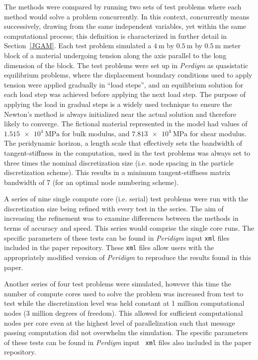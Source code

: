 \documentclass[preprint,12pt]{elsarticle}
\begin{document}
The methods were compared by running two sets of test problems where each
method would solve a problem concurrently. In this context, concurrently means
successively, drawing from the same independent variables, yet within the same
computational process; this definition is characterized in further detail in
Section~\ref{JGAM}. Each test problem simulated a $\SI{4}{\meter}$ by
$\SI{0.5}{\meter}$ by $\SI{0.5}{\meter}$ meter block of a material undergoing
tension along the axis parallel to the long dimension of the block. The test
problems were set up in \emph{Perdigm} as quasistatic equilibrium problems,
where the displacement boundary conditions used to apply tension were applied
gradually in ``load steps'', and an equilibrium solution for each load step was
achieved before applying the next load step. The purpose of applying the load
in gradual steps is a widely used technique to ensure the Newton's method is
always initialized near the actual solution and therefore likely to converge.
The fictional material represented in the model had values of
$\SI{1.515e4}{\mega\pascal}$ for bulk modulus, and $\SI{7.813e4}{\mega\pascal}$
for shear modulus. The peridynamic horizon, a length scale that effectively
sets the bandwidth of tangent-stiffness in the computation, used in the test
problems was always set to three times the nominal discretization size (i.e.
node spacing in the particle discretization scheme). This results in a minimum
tangent-stiffness matrix bandwidth of 7 (for an optimal node numbering scheme).

A series of nine single compute core (i.e. serial) test problems were run with
the discretization size being refined with every test in the series. The aim of
increasing the refinement was to examine differences between the methods in
terms of accuracy and speed. This series would comprise the single core runs.
The specific parameters of these tests can be found in \emph{Peridigm} input
{\tt xml} files included in the paper repository. These {\tt xml} files allow
users with the appropriately modified version of \emph{Peridigm} to reproduce
the results found in this paper.

Another series of four test problems were simulated, however this time the
number of compute cores used to solve the problem was increased from test to
test while the discretization level was held constant at 1 million
computational nodes (3 million degrees of freedom). This allowed for sufficient
computational nodes per core even at the highest level of parallelization such
that message passing computation did not overwhelm the simulation.   The
specific parameters of these tests can be found in \emph{Perdigm} input {\tt
xml} files also included in the paper repository.
\end{document}
